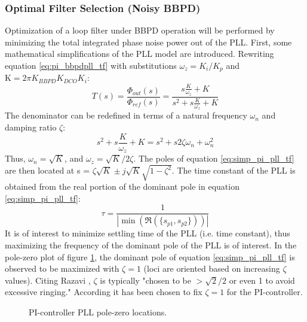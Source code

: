 \subsubsection{Optimal Filter Selection (Noisy BBPD)}
			Optimization of a loop filter under BBPD operation will be performed by minimizing the total integrated phase noise power out of the PLL. First, some mathematical simplifications of the PLL model are introduced. Rewriting equation \ref{eq:pi_bbpdpll_tf} with substitutions $\omega_z = K_i/K_p$ and $\mathrm{K} = 2\pi K_{BBPD}K_{DCO}K_{i}$:
			\begin{equation} \label{eq:simp_pi_pll_tf}
				T(s) = \frac{\Phi_{out}(s)}{\Phi_{ref}(s)} = \frac{s\frac{K}{\omega_z} + K }{s^2 + s\frac{K}{\omega_z} + K}
			\end{equation}
			The denominator can be redefined in terms of a natural frequency $\omega_n$ and damping ratio $\zeta$:
			\begin{equation}
				s^2 + s\frac{K}{\omega_z} + K = s^2 + s2\zeta\omega_n + \omega_n^2
			\end{equation}
			Thus, $\omega_n = \sqrt{K}$, and $\omega_z = \sqrt{K}/2\zeta$. The poles of equation \ref{eq:simp_pi_pll_tf} are then located at s = $\zeta\sqrt{K} \pm j\sqrt{K}\sqrt{1-\zeta^2}$. The time constant of the PLL is obtained from the real portion of the dominant pole in equation \ref{eq:simp_pi_pll_tf}:
			\begin{equation}
				\tau = \frac{1}{|\min(\Re(\{s_{p1}, s_{p2}\}))|}
			\end{equation}
			 It is of interest to minimize settling time of the PLL (i.e. time constant), thus maximizing the frequency of the dominant pole of the PLL is of interest. In the pole-zero plot of figure \ref{fig:pi_pll_pz}, the dominant pole of equation \ref{eq:simp_pi_pll_tf} is observed to be maximized with $\zeta=1$ (loci are oriented based on increasing $\zeta$ values). Citing Razavi \cite{razavi_2017}, $\zeta$ is typically 
			"chosen to be $>\sqrt{2}/2$ or even 1 to avoid excessive ringing." According it has been chosen to fix $\zeta=1$ for the PI-controller. 
			\begin{figure}[htb!]
				\center
				\caption{PI-controller PLL pole-zero locations.}
				\label{fig:pi_pll_pz}
			\end{figure}
			\FloatBarrier
